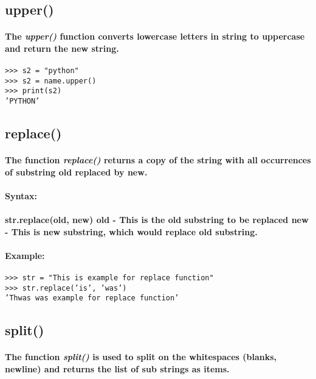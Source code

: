 \documentclass{book}
\begin{document}
\subsection*{upper()}

\paragraph{The \textit{upper()} function converts lowercase letters in string to uppercase and return the new string.}

\begin{verbatim}
>>> s2 = "python"
>>> s2 = name.upper()
>>> print(s2)
’PYTHON’
\end{verbatim}

\subsection*{replace()}

\paragraph{The function \textit{replace()} returns a copy of the string with all occurrences of substring old replaced by new.}

\paragraph{Syntax:}

\paragraph{
str.replace(old, new)
old - This is the old substring to be replaced
new - This is new substring, which would replace old substring.}

\paragraph{Example:}

\begin{verbatim}
>>> str = "This is example for replace function"
>>> str.replace(’is’, ’was’)
’Thwas was example for replace function’
\end{verbatim}

\subsection*{split()}

\paragraph{The function \textit{split()} is used to split on the whitespaces (blanks, newline) and returns the list of sub strings as items.}
\end{document}
